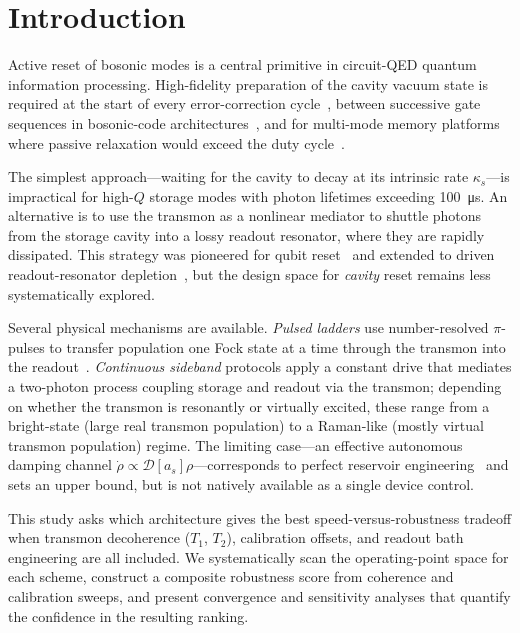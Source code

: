 \documentclass[aps,pra,twocolumn,reprint,floatfix,amsmath,amssymb]{revtex4-2}
\begin{document}
\section{Introduction}
\label{sec:intro}

Active reset of bosonic modes is a central primitive in circuit-QED quantum information processing.
High-fidelity preparation of the cavity vacuum state is required at the start of every error-correction cycle~\cite{ofek2016extending}, between successive gate sequences in bosonic-code architectures~\cite{eickbusch2022fast,heeres2015snap}, and for multi-mode memory platforms where passive relaxation would exceed the duty cycle~\cite{huang2025fastsideband,Reagor2016}.

The simplest approach---waiting for the cavity to decay at its intrinsic rate $\kappa_s$---is impractical for high-$Q$ storage modes with photon lifetimes exceeding \SI{100}{\us}.
An alternative is to use the transmon as a nonlinear mediator to shuttle photons from the storage cavity into a lossy readout resonator, where they are rapidly dissipated.
This strategy was pioneered for qubit reset~\cite{reed2010fast,geerlings2013demonstrating,magnard2018reset} and extended to driven readout-resonator depletion~\cite{mcclure2016rapid}, but the design space for \emph{cavity} reset remains less systematically explored.

Several physical mechanisms are available.
\emph{Pulsed ladders} use number-resolved $\pi$-pulses to transfer population one Fock state at a time through the transmon into the readout~\cite{huang2025fastsideband}.
\emph{Continuous sideband} protocols apply a constant drive that mediates a two-photon process coupling storage and readout via the transmon; depending on whether the transmon is resonantly or virtually excited,  these range from a bright-state (large real transmon population) to a Raman-like (mostly virtual transmon population) regime.
The limiting case---an effective autonomous damping channel $\dot{\rho} \propto \mathcal{D}[a_s]\rho$---corresponds to perfect reservoir engineering~\cite{poyatos1996quantum,leghtas2015confining} and sets an upper bound, but is not natively available as a single device control.

This study asks which architecture gives the best speed-versus-robustness tradeoff when transmon decoherence ($T_1$, $T_2$), calibration offsets, and readout bath engineering are all included.
We systematically scan the operating-point space for each scheme, construct a composite robustness score from coherence and calibration sweeps, and present convergence and sensitivity analyses that quantify the confidence in the resulting ranking.
\end{document}
